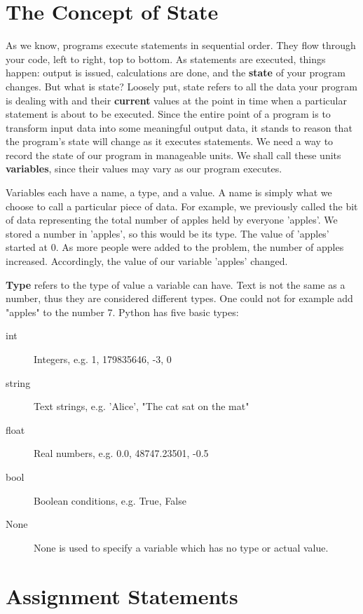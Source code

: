 \section{The Concept of State}

As we know, programs execute statements in sequential order. They flow through your code, left to right, top to bottom. As statements are executed, things happen: output is issued, calculations are done, and the \textbf{state} of your program changes. But what is state?   Loosely put, state refers to all the data your program is dealing with   and their \textbf{current} values at the point in time when a   particular statement is about to be executed. Since the entire point of a program is to transform input data into some meaningful output data, it stands to reason that the program's state will change as it executes statements. We need a way to record the state of our program in manageable units. We shall call these units   \textbf{variables}, since their values may vary as our program executes.

Variables each have a name, a type, and a value. A name is simply   what we choose to call a particular piece of data. For example, we   previously called the bit of data representing the total number of   apples held by everyone 'apples'. We stored a number in 'apples', so this would be its type. The value of 'apples' started at 0. As more people were added to the problem, the number of apples   increased. Accordingly, the value of our variable   'apples' changed.

\textbf{Type} refers to the type of value a variable can   have. Text is not the same as a number, thus they are considered   different types. One could not for example add "apples" to the number   7. Python has five basic types:
\begin{description}
	\item[int] Integers, e.g. 1, 179835646, -3, 0
	\item[string] Text strings, e.g. 'Alice', "The cat sat on the mat"
	\item[float] Real numbers, e.g. 0.0, 48747.23501, -0.5
	\item[bool] Boolean conditions, e.g. True, False
	\item[None] None is used to specify a variable which has no type or actual value.
\end{description}

\section{Assignment Statements}

